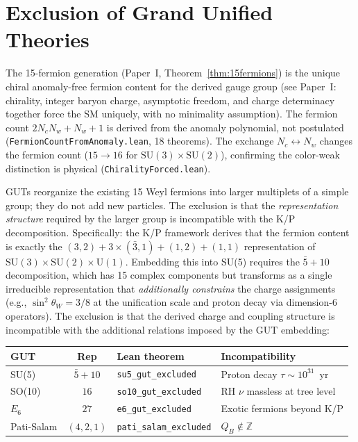 \documentclass[11pt,letterpaper]{article}
\begin{document}
\section{Exclusion of Grand Unified Theories}

The 15-fermion generation (Paper~I, Theorem~\ref{thm:15fermions}) is the
unique chiral anomaly-free fermion content for the derived gauge group
(see Paper~I: chirality, integer baryon charge, asymptotic freedom, and
charge determinacy together force the SM uniquely, with no minimality
assumption).  The fermion count $2 N_c N_w + N_w + 1$ is derived from
the anomaly polynomial, not postulated
(\texttt{FermionCountFromAnomaly.lean}, 18 theorems).  The exchange
$N_c \leftrightarrow N_w$ changes the fermion count ($15 \to 16$
for $\mathrm{SU}(3) \times \mathrm{SU}(2)$), confirming the
color-weak distinction is physical
(\texttt{ChiralityForced.lean}).

\medskip
\noindent
GUTs reorganize the existing 15 Weyl fermions into larger multiplets
of a simple group; they do not add new particles.  The exclusion
is that the \emph{representation structure} required by
the larger group is incompatible with the K/P decomposition.
Specifically: the K/P framework derives that the fermion content is
exactly the $(3,2) + 3 \times (\bar{3},1) + (1,2) + (1,1)$
representation of $\mathrm{SU}(3) \times \mathrm{SU}(2) \times
\mathrm{U}(1)$.  Embedding this into SU(5) requires the
$\bar{5} + 10$ decomposition, which has 15 complex components but
transforms as a single irreducible representation that
\emph{additionally constrains} the charge assignments (e.g.,
$\sin^2\theta_W = 3/8$ at the unification scale and proton decay
via dimension-6 operators).  The exclusion is that the derived
charge and coupling structure is incompatible with the additional
relations imposed by the GUT embedding:

\begin{center}
\small
\begin{tabular}{@{}lclp{4cm}@{}}
\toprule
GUT & Rep & Lean theorem & Incompatibility \\
\midrule
SU(5) & $\bar{5}{+}10$ &
  \texttt{su5\_gut\_excluded} & Proton decay $\tau \sim 10^{31}$~yr \\
SO(10) & $16$ &
  \texttt{so10\_gut\_excluded} & RH $\nu$ massless at tree level \\
$E_6$ & $27$ &
  \texttt{e6\_gut\_excluded} & Exotic fermions beyond K/P \\
Pati-Salam & $(4,2,1)$ &
  \texttt{pati\_salam\_excluded} & $Q_B \notin \mathbb{Z}$ \\
\bottomrule
\end{tabular}
\end{center}
\end{document}
